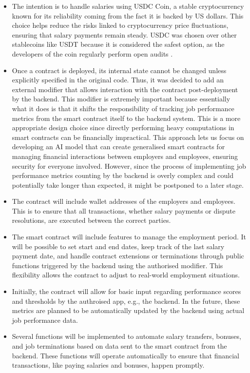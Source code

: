 \begin{itemize}
    \item The intention is to handle salaries using USDC Coin, a stable cryptocurrency known for its reliability coming from the fact it is backed by US dollars. This choice helps reduce the risks linked to cryptocurrency price fluctuations, ensuring that salary payments remain steady. USDC was chosen over other stablecoins like USDT because it is considered the safest option, as the developers of the coin regularly perform open audits \cite{LyonsEtAl2023, VediaEtAl2023}.
    \item Once a contract is deployed, its internal state cannot be changed unless explicitly specified in the original code. Thus, it was decided to add an external modifier that allows interaction with the contract post-deployment by the backend. This modifier is extremely important because essentially what it does is that it shifts the responsibility of tracking job performance metrics from the smart contract itself to the backend system. This is a more appropriate design choice since directly performing heavy computations in smart contracts can be financially impractical. This approach lets us focus on developing an AI model that can create generalised smart contracts for managing financial interactions between employers and employees, ensuring security for everyone involved. However, since the process of implementing job performance metrics counting by the backend is overly complex and could potentially take longer than expected, it might be postponed to a later stage.
    \item The contract will include wallet addresses of the employers and employees. This is to ensure that all transactions, whether salary payments or dispute resolutions, are executed between the correct parties.
    \item The smart contract will include features to manage the employment period. It will be possible to set start and end dates, keep track of the last salary payment date, and handle contract extensions or terminations through public functions triggered by the backend using the authorised modifier. This flexibility allows the contract to adjust to real-world employment situations.
    \item Initially, the contract will allow for basic input regarding performance scores and thresholds by the authroised app, e.g., the backend. In the future, these metrics are planned to be automatically updated by the backend using actual job performance data. 
    \item Several functions will be implemented to automate salary transfers, bonuses, and job terminations based on data sent to the smart contract from the backend. These functions will operate automatically to ensure that financial transactions, like paying salaries and bonuses, happen promptly.
\end{itemize}

